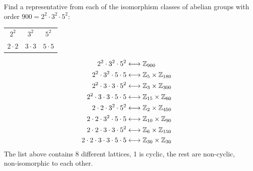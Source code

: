 \begin{example}
Find a representative from each of the isomorphism classes of abelian groups with order
$900=2^2\cdot 3^2 \cdot 5^2$:
\begin{table}[h!]
    \centering
    \begin{tabular}{c|c|c} \hline
         $2^2$& $3^2$& $5^2$   \\
         $2\cdot 2$& $3\cdot 3$& $5\cdot 5$
    \end{tabular}
\end{table}
\begin{align}
    2^2\cdot 3^2 \cdot 5^2 &\longleftrightarrow {\mathbb{Z}}_{900} \nonumber \\
    2^2 \cdot 3^2 \cdot 5\cdot 5 &\longleftrightarrow {\mathbb{Z}}_5\times {\mathbb{Z}}_{180} \nonumber \\
    2^2 \cdot 3\cdot 3 \cdot 5^2 &\longleftrightarrow {\mathbb{Z}}_3 \times {\mathbb{Z}}_{300} \nonumber \\
    2^2 \cdot 3\cdot 3 \cdot 5 \cdot 5 &\longleftrightarrow {\mathbb{Z}}_{15} \times {\mathbb{Z}}_{60} \nonumber \\
    2\cdot 2 \cdot 3^2 \cdot 5^2 &\longleftrightarrow {\mathbb{Z}}_2\times {\mathbb{Z}}_{450} \nonumber \\
    2\cdot 2 \cdot 3^2 \cdot 5 \cdot 5  &\longleftrightarrow {\mathbb{Z}}_{10}\times {\mathbb{Z}}_{90} \nonumber \\
    2\cdot 2 \cdot 3 \cdot 3 \cdot 5^2 &\longleftrightarrow {\mathbb{Z}}_{6}\times {\mathbb{Z}}_{150} \nonumber \\
    2\cdot 2\cdot 3\cdot 3 \cdot 5 \cdot 5 &\longleftrightarrow {\mathbb{Z}}_{30}\times {\mathbb{Z}}_{30} \nonumber
\end{align}
The list above contains 8 different lattices, 1 is cyclic, the rest are non-cyclic, non-isomorphic
to each other.
\end{example}
